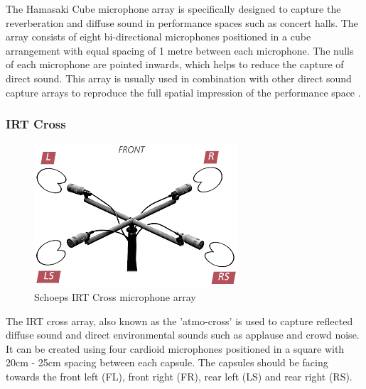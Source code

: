 			The Hamasaki Cube microphone array is specifically designed to capture the reverberation and diffuse sound in performance spaces such as concert halls. The array consists of eight bi-directional microphones positioned in a cube arrangement with equal spacing of 1 metre between each microphone. The nulls of each microphone are pointed inwards, which helps to reduce the capture of direct sound. This array is usually used in combination with other direct sound capture arrays to reproduce the full spatial impression of the performance space \cite{TheileWittek}.

		\subsubsection{IRT Cross}

			\begin{figure}[h!]
			\begin{center}
				\includegraphics[width = 0.5\linewidth]{images/mic/irt.png}
				\caption{Schoeps IRT Cross microphone array \cite{IRTschoeps}}
				\label{irt}
			\end{center}
			\end{figure}

			The IRT cross array, also known as the 'atmo-cross' is used to capture reflected diffuse sound and direct environmental sounds such as applause and crowd noise\cite{IRTschoeps}. It can be created using four cardioid microphones positioned in a square with 20cm - 25cm spacing between each capsule. The capsules should be facing towards the front left (FL), front right (FR), rear left (LS) and rear right (RS).